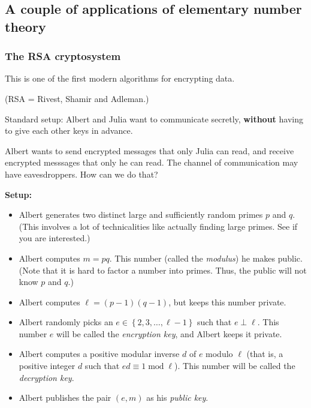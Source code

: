\documentclass[numbers=enddot,12pt,final,onecolumn,notitlepage]{scrartcl}%
\numberwithin{exer}{subsection}
\theoremstyle{definition}
\begin{document}
\subsection{A couple of applications of elementary number theory}

\subsubsection{The RSA cryptosystem}

This is one of the first modern algorithms for encrypting data.

(RSA = Rivest, Shamir and Adleman.)

Standard setup: Albert and Julia want to communicate secretly,
\textbf{without} having to give each other keys in advance.

Albert wants to send encrypted messages that only Julia can read, and receive
encrypted messsages that only he can read. The channel of communication may
have eavesdroppers. How can we do that?

\textbf{Setup:}

\begin{itemize}
\item Albert generates two distinct large and sufficiently random primes $p$
and $q$. (This involves a lot of technicalities like actually finding large
primes. See \cite{Gallier-RSA} if you are interested.)

\item Albert computes $m=pq$. This number (called the \textit{modulus}) he
makes public. (Note that it is hard to factor a number into primes. Thus, the
public will not know $p$ and $q$.)

\item Albert computes $\ell=\left(  p-1\right)  \left(  q-1\right)  $, but
keeps this number private.

\item Albert randomly picks an $e\in\left\{  2,3,\ldots,\ell-1\right\}  $ such
that $e\perp\ell$. This number $e$ will be called the \textit{encryption key},
and Albert keeps it private.

\item Albert computes a positive modular inverse $d$ of $e$ modulo $\ell$
(that is, a positive integer $d$ such that $ed\equiv1\operatorname{mod}\ell$).
This number will be called the \textit{decryption key}.

\item Albert publishes the pair $\left(  e,m\right)  $ as his \textit{public
key}.
\end{itemize}
\end{document}
